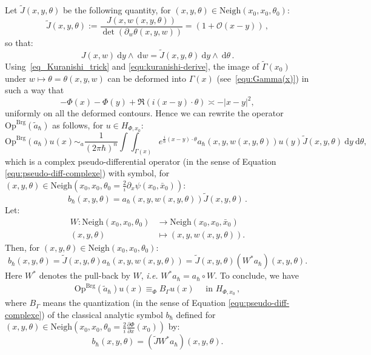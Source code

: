 \documentclass{article}
\newcommand{\Vois}{\mathrm{Neigh}}
\newcommand{\Op}{\mathrm{Op}}
\newcommand{\Brg}{\mathrm{Brg}}
\newcommand{\DD}{\:\!\mathrm{d}}
\newcommand{\intint}{\int\!\!\!\!\int}
\newcommand{\h}{\hbar}
\newcommand{\hnegl}{\equiv_\Phi}
\begin{document}
Let $\tilde{J}(x, y, \theta)$ be the following quantity, for
$(x, y, \theta) \in \Vois(x_0, x_0, \theta_0)$:
\begin{equation} \label{defi_J} \tilde{J}(x, y, \theta) := \dfrac{J(x,
    w(x, y, \theta))}{\det \left( \partial_w \theta(x, y, w) \right) }
  = (1+\mathcal{O}(x-y))\,,
\end{equation}
so that:
\[
J (x, w) \DD y \wedge \DD w = \tilde{J}(x, y, \theta) \DD y \wedge \DD
\theta \,.
\]
Using~\eqref{eq_Kuranishi_trick} and \eqref{equ:kuranishi-derive}, the
image of $\tilde \Gamma(x_0)$ under $w\mapsto \theta=\theta(x,y,w)$
can be deformed into $\Gamma(x)$ (see~\eqref{equ:Gamma(x)}) in such a
way that 
\[
-\Phi(x) - \Phi(y) + \Re \left( i(x-y)\cdot\theta \right) \asymp
-|x-y|^2 ,
\]
uniformly on all the deformed contours.  Hence we can rewrite the
operator $ \Op^{\Brg}(\tilde a_{ \hbar})$ as follows, for
$u \in H_{ \Phi, x_0}$:
\[
\Op^{\Brg}(a_{ \hbar}) u(x) \sim_a \dfrac{1}{( 2 \pi \hbar)^{n}}
\intint_{\Gamma(x)} \! e^{\frac{i}{\h} (x-y)\cdot\theta} a_{ \hbar}(x,
y, w(x, y, \theta)) u(y) \tilde{J}(x, y, \theta) \DD y \DD \theta,
\]
which is a complex pseudo-differential operator (in the sense of
Equation \eqref{equ:pseudo-diff-complexe}) with symbol, for
$(x, y, \theta) \in \Vois(x_0, x_0, \theta_0= \frac{2}{i} \partial_x
\psi(x_0, \bar{x}_0))$:
\begin{equation} \label{equation_symbol_b} b_{ \hbar}(x, y, \theta) =
  a_{ \hbar}(x, y, w(x,y, \theta)) \tilde{J}(x, y, \theta) \,.
\end{equation}
Let:
\begin{align}
  \label{equ:defi-W}
  W : \Vois(x_0, x_0, \theta_0) 
  & \longrightarrow \Vois \left( x_0, x_0,  \bar{x}_0 \right) \\
  (x, y, \theta) & \longmapsto (x, y, w(x,y,\theta)).
\end{align}
Then, for $(x, y, \theta) \in \Vois \left( x_0, x_0, \theta_0\right)$:
\[
b_{ \hbar}(x, y, \theta) = \tilde{J}(x, y, \theta) a_{ \hbar}(x, y,
w(x, y, \theta)) = \tilde{J}(x, y, \theta) (W^* a_{ \hbar})(x, y,
\theta).
\]
Here $W^*$ denotes the pull-back by $W$, \emph{i.e.}
$W^* a_\h = a_\h \circ W$.  To conclude, we have
\begin{align}
  \Op^{\Brg}(\tilde a_{ \hbar}) u(x) \hnegl B_{\Gamma} u(x) \quad \text{ in } H_{ \Phi, x_0}\,,
\end{align}
where $B_{\Gamma}$ means the quantization (in the sense of Equation
\eqref{equ:pseudo-diff-complexe}) of the classical analytic symbol
$b_{ \hbar} $ defined for
$(x, y, \theta) \in \Vois \left( x_0, x_0, \theta_0 =\frac{2}{i}
  \frac{\partial \Phi}{\partial x}(x_0) \right)$ by:
\[
b_{ \hbar}(x, y, \theta) = \left( \tilde{J} W^* a_{ \hbar} \right) (x,
y, \theta).
\]
\end{document}
